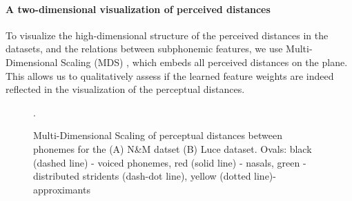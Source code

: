 \paragraph{A two-dimensional visualization of perceived distances} To visualize the high-dimensional structure of the perceived distances in the datasets, and the relations between subphonemic features, we use Multi-Dimensional Scaling (MDS) \citep{kruskal1964}, which embeds all perceived distances on the plane. This allows us to qualitatively assess if the learned feature weights are indeed reflected in the visualization of the perceptual distances.

\begin{figure}[h]
\caption{Multi-Dimensional Scaling of perceptual distances between phonemes for the  (A) N\&M datset (B) Luce dataset. Ovals: black (dashed line) - voiced phonemes, red (solid line) - nasals, green - distributed stridents (dash-dot line), yellow (dotted line)- approximants}.
\end{figure}

